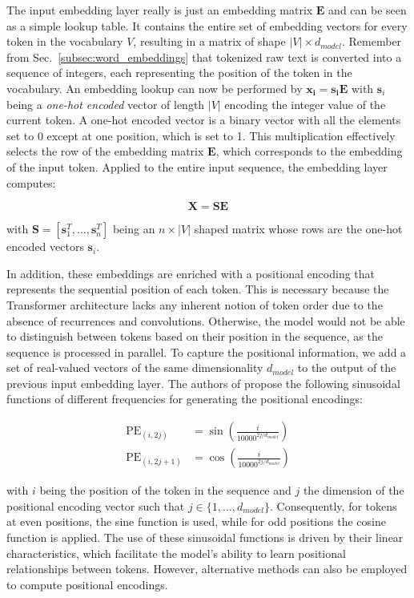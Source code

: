 The input embedding layer really is just an embedding matrix $\bm{E}$ and can be
seen as a simple lookup table. It contains the entire set of embedding vectors
for every token in the vocabulary $V$, resulting in a matrix of shape $|V|
\times d_{model}$. Remember from Sec.~\ref{subsec:word_embeddings} that
tokenized raw text is converted into a sequence of integers, each representing
the position of the token in the vocabulary. An embedding lookup can now be
performed by $\bm{x_i} = \bm{s_i} \bm{E}$ with $\bm{s} _i$ being a
\textit{one-hot encoded} vector of length $|V|$ encoding the integer value of
the current token. A one-hot encoded vector is a binary vector with all the
elements set to 0 except at one position, which is set to 1. This multiplication
effectively selects the row of the embedding matrix $\bm{E}$, which corresponds
to the embedding of the input token. Applied to the entire input sequence, the
embedding layer computes:

\begin{equation} \label{eq:input_embedding}
    \bm{X} = \bm{S} \bm{E}
\end{equation}

with $\bm{S} = [\bm{s}_1^T, \ldots, \bm{s}_n^T]$ being an $n \times |V|$ shaped
matrix whose rows are the one-hot encoded vectors $\bm{s}_i$.

In addition, these embeddings are enriched with a positional encoding that
represents the sequential position of each token. This is necessary because the
Transformer architecture lacks any inherent notion of token order due to the
absence of recurrences and convolutions. Otherwise, the model would not be able
to distinguish between tokens based on their position in the sequence, as the
sequence is processed in parallel. To capture the positional information, we add
a set of real-valued vectors of the same dimensionality $d_{model}$ to the
output of the previous input embedding layer. The authors of
\cite{vaswani2017attention} propose the following sinusoidal functions of
different frequencies for generating the positional encodings:

\begin{align}
    \label{eq:positional_encoding}
    \text{PE}_{(i, 2j)} &= \sin\left(\frac{i}{10000^{2j/d_{model}}}\right) \\
    \text{PE}_{(i, 2j+1)} &= \cos\left(\frac{i}{10000^{2j/d_{model}}}\right)
\end{align}

with $i$ being the position of the token in the sequence and $j$ the dimension
of the positional encoding vector such that $j \in \{1, \ldots, d_{model}\}$.
Consequently, for tokens at even positions, the sine function is used, while for
odd positions the cosine function is applied. The use of these sinusoidal
functions is driven by their linear characteristics, which facilitate the
model's ability to learn positional relationships between tokens. However,
alternative methods can also be employed to compute positional encodings.

